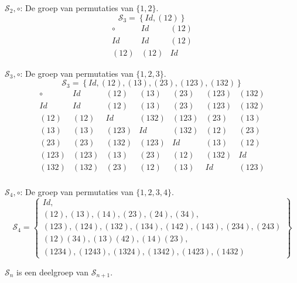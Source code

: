 \documentclass[main.tex]{subfiles}
\begin{document}
\begin{vb}
  $\mathcal{S}_{2},\circ$: De groep van permutaties van $\{ 1,2 \}$.
  \[ \mathcal{S}_{3} = \left\{ Id, (12) \right\} \]
  \[
  \begin{array}{c|cc}
    \circ & Id & (12) \\
    \hline
    Id & Id & (12)\\
    (12) & (12) & Id
  \end{array}
  \]
\commj {}
\end{vb}

\begin{vb}
  \label{vb:groep-s3}
  $\mathcal{S}_{3},\circ$: De groep van permutaties van $\{ 1,2,3 \}$.
  \[ \mathcal{S}_{3} = \left\{ Id, (12), (13), (23), (123), (132) \right\} \]
  \[
  \begin{array}{c|cccccc}
    \circ & Id & (12) & (13) & (23) & (123) & (132) \\
    \hline
    Id & Id & (12) & (13) & (23) & (123) & (132)\\
    (12) & (12) & Id & (132) & (123) & (23) & (13)\\
    (13) & (13) & (123) & Id & (132) & (12) & (23)\\
    (23) & (23) & (132) & (123) & Id & (13) & (12)\\
    (123) & (123) & (13) & (23) & (12) & (132) & Id\\
    (132) & (132) & (23) & (12) & (13) & Id & (123)\\
  \end{array}
  \]
\commn \cycln
\end{vb}

\begin{vb}
  $\mathcal{S}_{4},\circ$: De groep van permutaties van $\{ 1,2,3,4 \}$.
  \[
  \mathcal{S}_{4} =
  \left\{
  \begin{array}{l}
     Id,\\
     (12), (13), (14), (23), (24), (34),\\
     (123), (124), (132), (134), (142), (143), (234), (243)\\
     (12)(34), (13)(42), (14)(23),\\
     (1234), (1243), (1324), (1342), (1423), (1432)
  \end{array}
  \right\}
  \]
\commn \cycln
\end{vb}

\begin{ei}
  $\mathcal{S}_{n}$ is een deelgroep van $\mathcal{S}_{n+1}$.
\end{ei}
\end{document}
